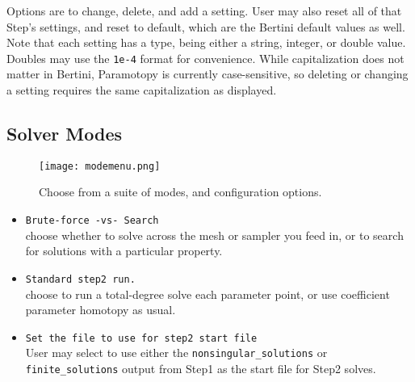 
Options are to change, delete, and add a setting.  User may also reset all of that Step's settings, and reset to default, which are the Bertini default values as well.  Note that each setting has a type, being either a string, integer, or double value.  Doubles may use the \texttt{1e-4} format for convenience.  While capitalization does not matter in Bertini, Paramotopy is currently case-sensitive, so deleting or changing a setting requires the same capitalization as displayed.




\subsection{Solver Modes}


\begin{figure}[h]
\begin{center}
\texttt{[image: modemenu.png]}
\caption[Solver Mode Menu]{ Choose from a suite of modes, and configuration options.}
\label{screen:modemenu}
\end{center}
\end{figure}



\begin{itemize}
	\item  {\tt Brute-force -vs- Search}  \\ choose whether to solve across the mesh or sampler you feed in, or to search for solutions with a particular property.
	\item {\tt Standard step2 run.} \\ choose to run a total-degree solve each parameter point, or use coefficient parameter homotopy as usual.
	\item \texttt{Set the file to use for step2 start file} \\ User may select to use either the \texttt{nonsingular\_solutions} or \texttt{finite\_solutions} output from Step1 as the start file for Step2 solves.
\end{itemize}

